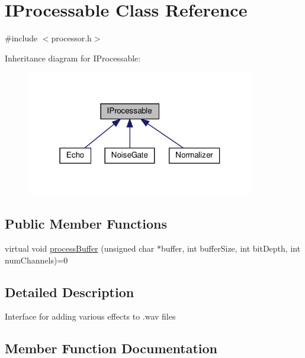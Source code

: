 \hypertarget{classIProcessable}{}\section{I\+Processable Class Reference}
\label{classIProcessable}


{\ttfamily \#include $<$processor.\+h$>$}



Inheritance diagram for I\+Processable\+:\nopagebreak
\begin{figure}[H]
\begin{center}
\leavevmode
\includegraphics[width=283pt]{d5/dfc/classIProcessable__inherit__graph}
\end{center}
\end{figure}
\subsection*{Public Member Functions}
\begin{DoxyCompactItemize}
\item 
virtual void \hyperlink{classIProcessable_a818d23db44eefe70ef052c3ce9340f11}{process\+Buffer} (unsigned char $\ast$buffer, int buffer\+Size, int bit\+Depth, int num\+Channels)=0
\end{DoxyCompactItemize}


\subsection{Detailed Description}
Interface for adding various effects to .wav files 

\subsection{Member Function Documentation}
\mbox{\label{classIProcessable_a818d23db44eefe70ef052c3ce9340f11}} 
